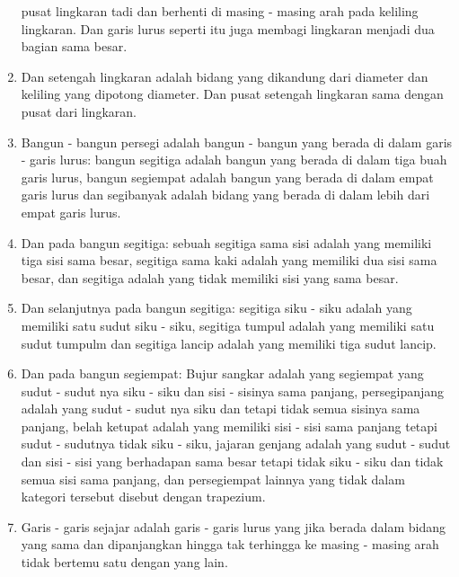 \documentclass[a4paper]{book}
\begin{document}
\begin{enumerate}
pusat lingkaran tadi dan berhenti di masing - masing arah pada
keliling lingkaran. Dan garis lurus seperti itu juga membagi lingkaran 
menjadi dua bagian sama besar.
\item Dan setengah lingkaran adalah bidang yang dikandung dari diameter dan 
keliling yang dipotong diameter. Dan pusat setengah lingkaran sama dengan 
pusat dari lingkaran.
\item Bangun - bangun persegi adalah bangun - bangun yang berada di dalam
garis - garis lurus: bangun segitiga adalah bangun yang berada di dalam tiga buah
garis lurus, bangun segiempat adalah bangun yang berada di dalam empat garis lurus dan 
segibanyak adalah bidang yang berada di dalam lebih dari empat garis lurus.
\item Dan pada bangun segitiga: sebuah segitiga sama sisi adalah yang memiliki tiga
sisi sama besar, segitiga sama kaki adalah yang memiliki dua sisi sama besar, dan 
segitiga adalah yang tidak memiliki sisi yang sama besar.
\item Dan selanjutnya pada bangun segitiga: segitiga siku - siku adalah yang memiliki
satu sudut siku - siku, segitiga tumpul adalah yang memiliki satu sudut tumpulm dan 
segitiga lancip adalah yang memiliki tiga sudut lancip.
\item Dan pada bangun segiempat: Bujur sangkar adalah yang segiempat yang
sudut - sudut nya siku - siku dan sisi - sisinya sama panjang, persegipanjang
adalah yang sudut - sudut nya siku dan tetapi tidak semua sisinya sama panjang, 
belah ketupat adalah yang memiliki sisi - sisi sama panjang tetapi
sudut - sudutnya tidak siku - siku, jajaran genjang adalah yang sudut - sudut 
dan sisi - sisi yang berhadapan sama besar tetapi tidak siku - siku dan tidak 
semua sisi sama panjang, dan persegiempat lainnya yang tidak dalam kategori tersebut
disebut dengan trapezium.
\item Garis - garis sejajar adalah garis - garis lurus yang jika berada dalam 
bidang yang sama dan dipanjangkan hingga tak terhingga ke masing - masing arah
tidak bertemu satu dengan yang lain.  
\end{enumerate}
\end{document}
